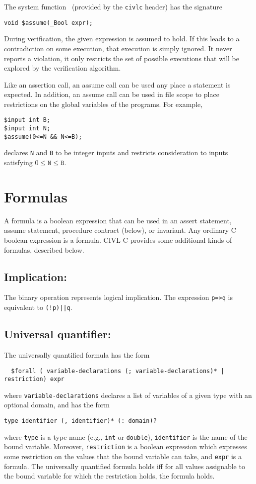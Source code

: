 The system function \cassume\ (provided by the \texttt{civlc} header) has the signature
\begin{verbatim}
void $assume(_Bool expr);
\end{verbatim}

During verification, the given expression is assumed to hold.  If
this leads to a contradiction on some execution, that execution is
simply ignored.  It never reports a violation, it only restricts the
set of possible executions that will be explored by the verification
algorithm.

Like an assertion call, an assume call can be used any place
a statement is expected.  In addition, an assume call can be used
in file scope to place restrictions on the global variables of the
programs.  For example,
\begin{verbatim}
$input int B;
$input int N;
$assume(0<=N && N<=B);
\end{verbatim}
declares \texttt{N} and \texttt{B} to be integer inputs and restricts
consideration to inputs satisfying $0\leq\texttt{N}\leq\texttt{B}$.


\section{Formulas}

A formula is a boolean expression that can be used in an assert
statement, assume statement, procedure contract (below), or invariant.
Any ordinary C boolean expression is a formula. CIVL-C provides some
additional kinds of formulas, described below.

\subsection{Implication: \cimplies}

The binary operation \cimplies{} represents logical implication.
The expression \verb!p=>q! is equivalent to \verb~(!p)||q~.

\subsection{Universal quantifier: \cforall}

The universally quantified formula has the form
\begin{verbatim}
  $forall ( variable-declarations (; variable-declarations)* | restriction) expr
\end{verbatim}
where \verb!variable-declarations! declares a list of variables of a
given type with an optional domain, and has the form
\begin{verbatim}
type identifier (, identifier)* (: domain)?
\end{verbatim}
where \verb!type! is a type name (e.g., \texttt{int} or
\texttt{double}), \verb!identifier! is the name of the bound variable.
Moreover, \verb!restriction! is a boolean expression which expresses
some restriction on the values that the bound variable can take, and
\verb!expr! is a formula.  The universally quantified formula holds
iff for all values assignable to the bound variable for which the
restriction holds, the formula  holds.


